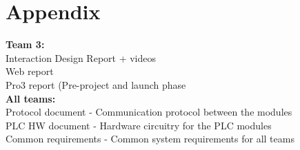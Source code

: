 \chapter{Appendix}
\textbf{Team 3:}
\\Interaction Design Report + videos
\\Web report
\\Pro3 report (Pre-project and launch phase
\\\textbf{All teams:}
\\Protocol document - Communication protocol between the modules
\\PLC HW document - Hardware circuitry for the PLC modules
\\Common requirements - Common system requirements for all teams